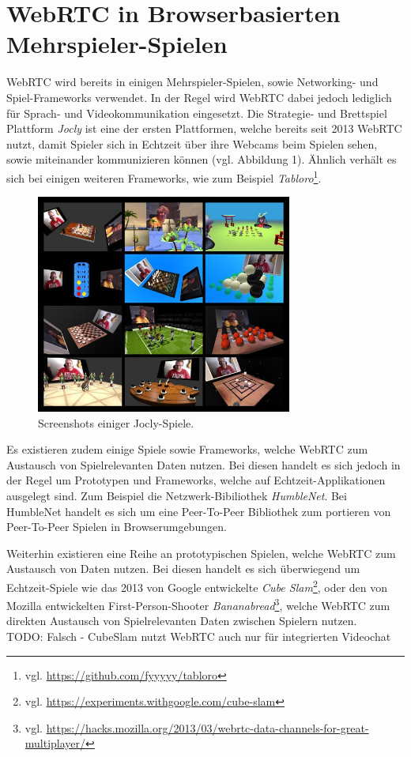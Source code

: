 \section{WebRTC in Browserbasierten Mehrspieler-Spielen}
\acs{WebRTC} wird bereits in einigen Mehrspieler-Spielen, sowie Networking- und Spiel-Frameworks verwendet. In der Regel wird WebRTC dabei jedoch lediglich für Sprach- und Videokommunikation eingesetzt. Die Strategie- und Brettspiel Plattform \textit{Jocly} ist eine der ersten Plattformen, welche bereits seit 2013 \acs{WebRTC} nutzt, damit Spieler sich in Echtzeit über ihre Webcams beim Spielen sehen, sowie miteinander kommunizieren können\cite{jocly2013} (vgl. Abbildung 1). Ähnlich verhält es sich bei einigen weiteren Frameworks, wie zum Beispiel \textit{Tabloro}\footnote{vgl. \url{https://github.com/fyyyyy/tabloro}}.

\begin{figure}[h]
\centering
\includegraphics[width=0.75\textwidth]{bilder/jocly-games.jpg}
\caption{Screenshots einiger Jocly-Spiele.}
\end{figure}

\color{red}
Es existieren zudem einige Spiele sowie Frameworks, welche WebRTC zum Austausch von Spielrelevanten Daten nutzen. Bei diesen handelt es sich jedoch in der Regel um Prototypen und Frameworks, welche auf Echtzeit-Applikationen ausgelegt sind. Zum Beispiel die Netzwerk-Bibiliothek \textit{HumbleNet}. Bei HumbleNet handelt es sich um eine Peer-To-Peer Bibliothek zum portieren von Peer-To-Peer Spielen in Browserumgebungen\cite{humblenet}.\par
\color{black}

Weiterhin existieren eine Reihe an prototypischen Spielen, welche \acs{WebRTC} zum Austausch von Daten nutzen. Bei diesen handelt es sich überwiegend um Echtzeit-Spiele wie das 2013 von Google entwickelte \textit{Cube Slam}\footnote{vgl. \url{https://experiments.withgoogle.com/cube-slam}}, oder den von Mozilla entwickelten First-Person-Shooter \textit{Bananabread}\footnote{vgl. \url{https://hacks.mozilla.org/2013/03/webrtc-data-channels-for-great-multiplayer/}}, welche \acs{WebRTC} zum direkten Austausch von Spielrelevanten Daten zwischen Spielern nutzen.\\
TODO: Falsch - CubeSlam nutzt WebRTC auch nur für integrierten Videochat\par

